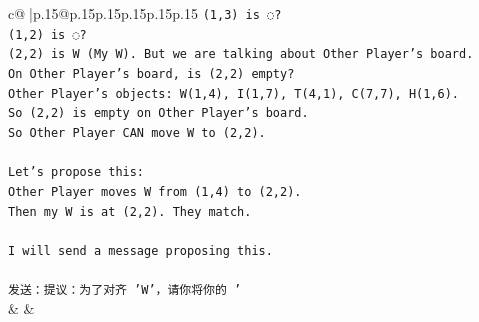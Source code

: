\documentclass{article}
\begin{document}
{\begin{supertabular}{c@{$\;$}|p{.15\linewidth}@{}p{.15\linewidth}p{.15\linewidth}p{.15\linewidth}p{.15\linewidth}p{.15\linewidth}}
{{{\texttt{(1,3) is ◌?} \\
\texttt{(1,2) is ◌?} \\
\texttt{(2,2) is W (My W). But we are talking about Other Player's board.} \\
\texttt{On Other Player's board, is (2,2) empty?} \\
\texttt{Other Player's objects: W(1,4), I(1,7), T(4,1), C(7,7), H(1,6).} \\
\texttt{So (2,2) is empty on Other Player's board.} \\
\texttt{So Other Player CAN move W to (2,2).} \\
\\ 
\texttt{Let's propose this:} \\
\texttt{Other Player moves W from (1,4) to (2,2).} \\
\texttt{Then my W is at (2,2). They match.} \\
\\ 
\texttt{I will send a message proposing this.} \\
\\ 
\texttt{发送：提议：为了对齐 'W'，请你将你的 '} \\
            }
        }
    }
    & & \\ \\


\end{supertabular}}
\end{document}

